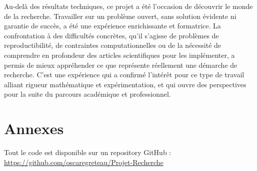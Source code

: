 \documentclass{magnolia}
\begin{document}
Au-delà des résultats techniques, ce projet a été l'occasion de découvrir le monde de la recherche. Travailler sur un problème ouvert, sans solution évidente ni garantie de succès, a été une expérience enrichissante et formatrice. La confrontation à des difficultés concrètes, qu'il s'agisse de problèmes de reproductibilité, de contraintes computationnelles ou de la nécessité de comprendre en profondeur des articles scientifiques pour les implémenter, a permis de mieux appréhender ce que représente réellement une démarche de recherche. C'est une expérience qui a confirmé l'intérêt pour ce type de travail alliant rigueur mathématique et expérimentation, et qui ouvre des perspectives pour la suite du parcours académique et professionnel.


\section{Annexes}

Tout le code est disponible sur un repository GitHub : \url{https://github.com/oscaregreteau/Projet-Recherche}
\printbibliography[heading=bibintoc,title={Références}]
\end{document}
